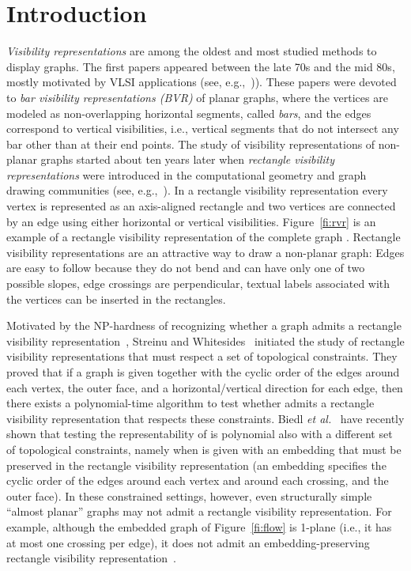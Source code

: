 \documentclass{article}
\begin{document}
\section{Introduction}

\emph{Visibility representations} are among the oldest and most studied methods to display graphs. The first papers appeared between the late 70s and the mid 80s, mostly motivated by VLSI applications (see, e.g.,~\cite{Duchet1983319,ov-grild-78,DBLP:journals/dcg/RosenstiehlT86,TamassiaTollis86,t-prg-84,DBLP:conf/compgeom/Wismath85})). These papers were devoted to \emph{bar visibility representations (BVR)} of planar graphs, where the vertices are modeled as non-overlapping horizontal segments, called \emph{bars}, and the edges correspond to vertical visibilities, i.e., vertical segments that do not intersect any bar other than at their end points.
The study of  visibility  representations of non-planar graphs started about ten years later when \emph{rectangle visibility representations} were introduced in the computational geometry and graph drawing communities (see, e.g.,~\cite{DBLP:journals/dam/DeanH97,DBLP:journals/comgeo/HutchinsonSV99,DBLP:journals/ipl/KantLTT97,DBLP:conf/cccg/Shermer96}). In a rectangle visibility representation every vertex is represented as an axis-aligned rectangle and two vertices are connected by an edge using either horizontal or vertical visibilities. Figure~\ref{fi:rvr} is an example of a rectangle visibility representation of the complete graph . Rectangle visibility representations are an attractive way to draw a non-planar graph: Edges are easy to follow because they do not bend and can have only one of two possible slopes, edge crossings are perpendicular, textual labels associated with the vertices can be inserted in the rectangles.


Motivated by the NP-hardness of recognizing whether a graph admits a rectangle visibility representation~\cite{DBLP:conf/cccg/Shermer96}, Streinu and Whitesides~\cite{DBLP:conf/stacs/StreinuW03} initiated the study of rectangle visibility representations that must respect a set of topological constraints. They proved that if a graph  is given together with the cyclic order of the edges around each vertex, the outer face, and a horizontal/vertical direction for each edge, then there exists a polynomial-time algorithm to test whether  admits a rectangle visibility representation that respects these constraints. Biedl {\em et al.}~\cite{SoCG} have recently shown that testing the representability of  is polynomial also with a different set of topological constraints, namely when  is given with an embedding  that must be preserved in the rectangle visibility representation (an embedding specifies the cyclic order of the edges around each vertex and around each crossing, and the outer face). In these constrained settings, however, even structurally simple ``almost planar'' graphs may not admit a  rectangle visibility representation. For example, although the embedded graph of Figure~\ref{fi:flow} is 1-plane (i.e., it has at most one crossing per edge), it does not admit an embedding-preserving rectangle visibility representation~\cite{SoCG}.
\end{document}

